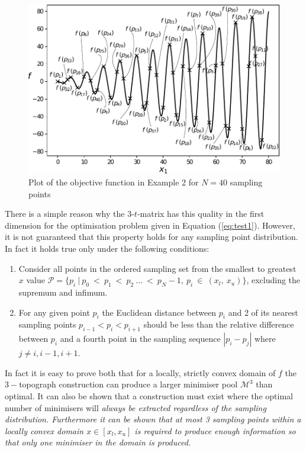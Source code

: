 \begin{figure} 
\centerline{\includegraphics[scale=1.0]{./Fig5.pdf}}
{\caption{Plot of the objective function in Example 2 for $N = 40$ sampling points} \label{fig:pot2}}
\end{figure}

There is a simple reason why the $3$-$t$-matrix has this quality in the first dimension for the optimisation problem given in Equation (\ref{eq:test1}). However, it is not guaranteed that this property holds for any sampling point distribution. In fact it holds true only under the following conditions:
\begin{enumerate}
\item Consider all points in the ordered sampling set from the smallest to greatest $x$ value $\mathcal{P} = \{p_i~|~p_{0}~<~p_{1}~<~p_{2}~\dots~<~p_N-1,~p_{i}~\in~(x_l,~x_u)\}$, excluding the supremum and infimum.
\item For any given point $p_i$ the Euclidean distance between $p_i$ and 2 of its nearest sampling points $p_{i-1} < p_i < p_{i+1}$ should be less than the relative difference between $p_i$ and a fourth point in the sampling sequence $|p_i - p_j|$ where $j \neq {i, i-1, i+1}$.
\end{enumerate}
 
In fact it is easy to prove both that for a locally, strictly convex domain of $f$ the $3-$topograph construction can produce a larger minimiser pool $\mathcal{M}^3$ than optimal. It can also be shown that a construction must exist where the optimal number of minimisers will \it{always} \normalfont be extracted regardless of the sampling distribution. Furthermore it can be shown that at most 3 sampling points within a locally convex domain $x \in [x_l, x_u]$ is required to produce enough information so that only one minimiser in the domain is produced.

